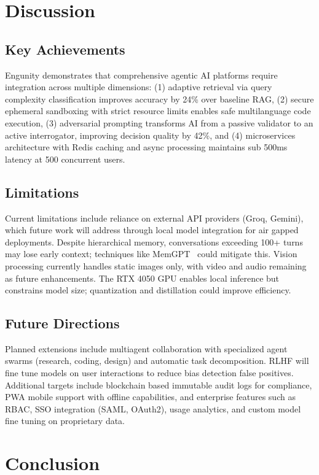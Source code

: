 \documentclass[conference]{IEEEtran}
\begin{document}
\section{Discussion}

\subsection{Key Achievements}
Engunity demonstrates that comprehensive agentic AI platforms require integration across multiple dimensions: (1) adaptive retrieval via query complexity classification improves accuracy by 24\% over baseline RAG, (2) secure ephemeral sandboxing with strict resource limits enables safe multilanguage code execution, (3) adversarial prompting transforms AI from a passive validator to an active interrogator, improving decision quality by 42\%, and (4) microservices architecture with Redis caching and async processing maintains sub 500ms latency at 500 concurrent users.

\subsection{Limitations}
Current limitations include reliance on external API providers (Groq, Gemini), which future work will address through local model integration for air gapped deployments. Despite hierarchical memory, conversations exceeding 100+ turns may lose early context; techniques like MemGPT~\cite{packer2023memgpt} could mitigate this. Vision processing currently handles static images only, with video and audio remaining as future enhancements. The RTX 4050 GPU enables local inference but constrains model size; quantization and distillation could improve efficiency.

\subsection{Future Directions}
Planned extensions include multiagent collaboration with specialized agent swarms (research, coding, design) and automatic task decomposition. RLHF will fine tune models on user interactions to reduce bias detection false positives. Additional targets include blockchain based immutable audit logs for compliance, PWA mobile support with offline capabilities, and enterprise features such as RBAC, SSO integration (SAML, OAuth2), usage analytics, and custom model fine tuning on proprietary data.

\section{Conclusion}
\end{document}
